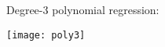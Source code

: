 \begin{answer}

    \graphicspath{ {./featuremaps/} }

Degree-3 polynomial regression:

\texttt{[image: poly3]}

\end{answer}
